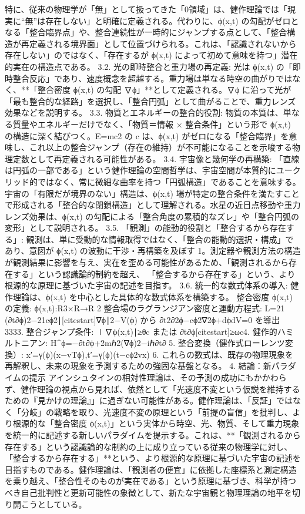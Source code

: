 \documentclass{article}
\begin{document}
特に、従来の物理学が「無」として扱ってきた「0領域」は、健作理論では「現実に“無”は存在しない」と明確に定義される。代わりに、ϕ(x,t) の勾配がゼロとなる「整合臨界点」や、整合連続性が一時的にジャンプする点として、「整合構造が再定義される境界面」として位置づけられる。これは、「認識されないから存在しない」のではなく、「存在するが ϕ(x,t) によって初めて意味を持つ」潜在的実在の構造点である。
3.2. 光の即時整合と重力場の再定義:
光は ϕ(x,t) の「即時整合反応」であり、速度概念を超越する。重力場は単なる時空の曲がりではなく、**「整合密度 ϕ(x,t) の勾配 ∇ϕ」**として定義される。∇ϕ に沿って光が「最も整合的な経路」を選択し、「整合円弧」として曲がることで、重力レンズ効果などを説明する。
3.3. 物質とエネルギーの整合的役割:
物質の本質は、単なる質量やエネルギーだけでなく、「物質＝情報 × 整合条件」という形で ϕ(x,t) の構造に深く結びつく。E=mc2 の c は、ϕ(x,t) がゼロになる「整合臨界」を意味し、これ以上の整合ジャンプ（存在の維持）が不可能になることを示唆する物理定数として再定義される可能性がある。
3.4. 宇宙像と幾何学の再構築:
「直線は円弧の一部である」という健作理論の空間哲学は、宇宙空間が本質的にユークリッド的ではなく、常に微細な曲率を持つ「円弧構造」であることを意味する。宇宙の「有限だが境界のない」構造は、ϕ(x,t) 場が特定の整合条件を満たすことで形成される「整合的な閉鎖構造」として理解される。水星の近日点移動や重力レンズ効果は、ϕ(x,t) の勾配による「整合角度の累積的なズレ」や「整合円弧の変形」として説明される。
3.5. 「観測」の能動的役割と「整合するから存在する」:
観測は、単に受動的な情報取得ではなく、「整合の能動的選択・構成」であり、意図が 
ϕ(x,t) の波動に干渉・再構築を及ぼす 1。測定器や観測方法の構造が観測結果に影響を与え、実在を歪める可能性があるため、「観測されるから存在する」という認識論的制約を超え、
「整合するから存在する」という、より根源的な原理に基づいた宇宙の記述を目指す。
3.6. 統一的な数式体系の導入:
健作理論は、ϕ(x,t) を中心とした具体的な数式体系を構築する。
整合密度 ϕ(x,t) の定義: ϕ(x,t):R3×R→R 2
整合場のラグランジアン密度と運動方程式: L=21​(∂t∂ϕ​)2−21​cϕ2​∣[cites​tart]∇ϕ∣2−V(ϕ) から ∂t2∂2ϕ​−cϕ2​∇2ϕ+dϕdV​=0 を導出 3333.
整合ジャンプ条件: ∣∇ϕ(x,t)∣≥θc​ または ​∂t∂ϕ​​[cites​tart]≥ωc​4.
健作的ハミルトニアン: H\textasciicircum{}ϕ​=−∂t∂ϕ​+2mℏ2​(∇ϕ)2−iℏ∂t∂​ 5.
整合変換（健作式ローレンツ変換）: x′=γ(ϕ)(x−vTϕ​),t′=γ(ϕ)(t−cϕ2​vx​) 6.
これらの数式は、既存の物理現象を再解釈し、未来の現象を予測するための強固な基盤となる。
4. 結論：新パラダイムの提示
アインシュタインの相対性理論は、その予測の成功にもかかわらず、健作理論の視点から見れば、依然として「光速度不変という仮説を維持するための『見かけの理論』」に過ぎない可能性がある。健作理論は、「反証」ではなく「分岐」の戦略を取り、光速度不変の原理という「前提の盲信」を批判し、より根源的な「整合密度 ϕ(x,t)」という実体から時空、光、物質、そして重力現象を統一的に記述する新しいパラダイムを提示する。これは、**「観測されるから存在する」という認識論的な制約の上に成り立っている従来の物理学に対し、「整合するから存在する」**という、より根源的な原理に基づいた宇宙の記述を目指すものである。健作理論は、「観測者の便宜」に依拠した座標系と測定構造を乗り越え、「整合性そのものが実在である」という原理に基づき、科学が持つべき自己批判性と更新可能性の象徴として、新たな宇宙観と物理理論の地平を切り開こうとしている。
\end{document}

